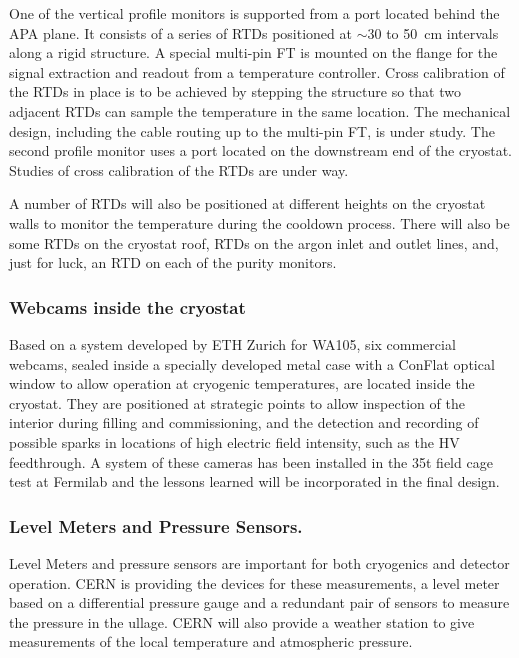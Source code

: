 One of  %
the vertical profile monitors is supported from a port located behind the APA plane. It consists of a series of RTDs positioned at $\sim$30 to 50~cm intervals %
along a rigid structure. %
A special multi-pin FT is mounted on the flange %
for the signal extraction and readout from a temperature controller.  Cross calibration of the RTDs in place is to be achieved by stepping the structure so that two adjacent RTDs can sample the temperature in the same location.
The mechanical design, including the cable routing up to the multi-pin FT, is under study.
The second profile monitor uses a port located on the downstream end of the cryostat. Studies of cross calibration of the RTDs are under way. 

A number of RTDs will also be positioned at different heights %
on the cryostat walls to monitor the temperature %
during the %
cooldown process. There will also be some RTDs on the cryostat roof,  RTDs on the argon inlet and outlet lines, and, just for luck, an RTD on each of the purity monitors.

\subsubsection{Webcams inside the cryostat}
	Based on %
	a system developed by ETH Zurich for WA105, six commercial webcams, sealed inside a specially developed metal case with a ConFlat optical window to allow operation at cryogenic temperatures, are located inside the cryostat. They are positioned at strategic points to allow inspection of the interior during filling and commissioning, %
	and the detection and recording of possible sparks in locations of high %
	electric field intensity, such as the HV feedthrough. A system of these cameras has been installed in the 35t field cage test at Fermilab and the lessons learned will be incorporated in the final design.
	
\subsubsection{Level Meters and Pressure Sensors.}
	Level Meters and pressure sensors are important for both cryogenics and detector operation. CERN is providing the devices for these measurements, a level meter based on a differential pressure gauge and a redundant pair of sensors to measure the pressure in the ullage. CERN will also provide a weather station to give measurements of the local temperature and atmospheric pressure.


